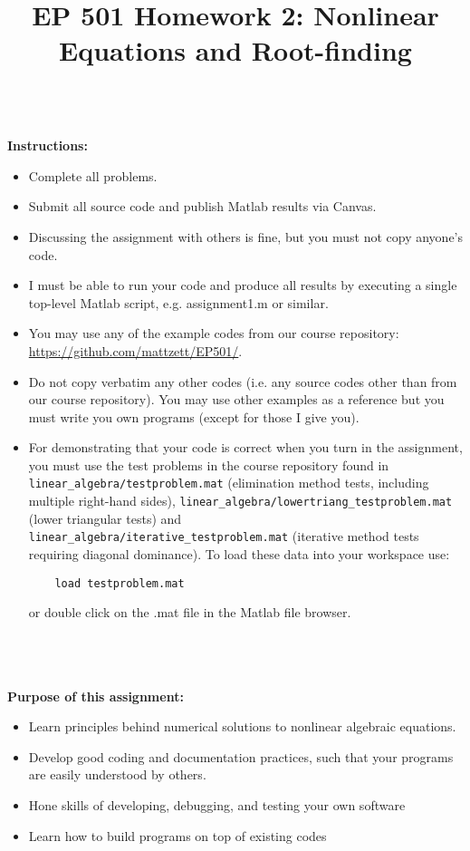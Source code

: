 \documentclass{article}
\begin{document}
\title{EP 501 Homework 2:  Nonlinear Equations and Root-finding}

\maketitle

~\\
\textbf{Instructions:}  
\begin{itemize}
  \item Complete all problems.
  \item Submit all source code and publish Matlab results via Canvas.  
  \item Discussing the assignment with others is fine, but you must not copy anyone's code.  
  \item I must be able to run your code and produce all results by executing a single top-level Matlab script, e.g. \textsf{assignment1.m} or similar.  
  \item You may use any of the example codes from our course repository:  \url{https://github.com/mattzett/EP501/}.
  \item Do not copy verbatim any other codes (i.e. any source codes other than from our course repository).  You may use other examples as a reference but you must write you own programs (except for those I give you).  
  \item For demonstrating that your code is correct when you turn in the assignment, you must use the test problems in the course repository found in \texttt{linear\_algebra/testproblem.mat} (elimination method tests, including multiple right-hand sides), \texttt{linear\_algebra/lowertriang\_testproblem.mat} (lower triangular tests) and \\ \texttt{linear\_algebra/iterative\_testproblem.mat} (iterative method tests requiring diagonal dominance).  To load these data into your workspace use:
    \begin{verbatim}
    load testproblem.mat
    \end{verbatim}
    or double click on the .mat file in the Matlab file browser.  
\end{itemize}
~\\~\\~\\
\textbf{Purpose of this assignment:}  
\begin{itemize}
  \item Learn principles behind numerical solutions to nonlinear algebraic equations.  
  \item Develop good coding and documentation practices, such that your programs are easily understood by others.  
  \item Hone skills of developing, debugging, and testing your own software
  \item Learn how to build programs on top of existing codes
\end{itemize}

\pagebreak

\begin{enumerate}
  \item    
  \begin{itemize}
    \item[(a)]  
  \item   
\end{enumerate}
\end{document}
